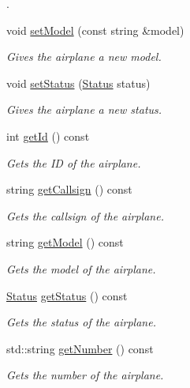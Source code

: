 \begin{DoxyCompactItemize}
\begin{DoxyCompactList}
. \end{DoxyCompactList}\item 
void \mbox{\hyperlink{class_airplane_aaeb19ae361b046ce543ad687aea63123}{set\+Model}} (const string \&model)
\begin{DoxyCompactList}\small\item\em Gives the airplane a new model. \end{DoxyCompactList}\item 
void \mbox{\hyperlink{class_airplane_adb44e51d140c297b5a05650f17d87125}{set\+Status}} (\mbox{\hyperlink{class_airplane_a2fe18f372ef9acb9d557998a560ad66e}{Status}} status)
\begin{DoxyCompactList}\small\item\em Gives the airplane a new status. \end{DoxyCompactList}\item 
int \mbox{\hyperlink{class_airplane_aedac81e80b724d61d1c9df7311067ba8}{get\+Id}} () const
\begin{DoxyCompactList}\small\item\em Gets the ID of the airplane. \end{DoxyCompactList}\item 
string \mbox{\hyperlink{class_airplane_af7e30dcc3191147869b0208edf7000c5}{get\+Callsign}} () const
\begin{DoxyCompactList}\small\item\em Gets the callsign of the airplane. \end{DoxyCompactList}\item 
string \mbox{\hyperlink{class_airplane_a1431ee85bdcb3238cf6f0aefc51d8828}{get\+Model}} () const
\begin{DoxyCompactList}\small\item\em Gets the model of the airplane. \end{DoxyCompactList}\item 
\mbox{\hyperlink{class_airplane_a2fe18f372ef9acb9d557998a560ad66e}{Status}} \mbox{\hyperlink{class_airplane_a35967a392b7274dc6a874bf3b73b7965}{get\+Status}} () const
\begin{DoxyCompactList}\small\item\em Gets the status of the airplane. \end{DoxyCompactList}\item 
std\+::string \mbox{\hyperlink{class_airplane_a29068c4308e9aef5f8d944840b4dba10}{get\+Number}} () const
\begin{DoxyCompactList}\small\item\em Gets the number of the airplane. \end{DoxyCompactList}\item 

\end{DoxyCompactItemize}
